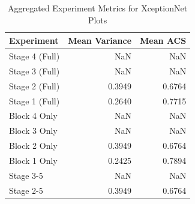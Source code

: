 \begin{table}
\caption{Aggregated Experiment Metrics for XceptionNet Plots}
\label{tab:exp_plot_data_xceptionnet}
\begin{tabular}{lrr}
\toprule
Experiment & Mean Variance & Mean ACS \\
\midrule
Stage 4 (Full) & NaN & NaN \\
Stage 3 (Full) & NaN & NaN \\
Stage 2 (Full) & 0.3949 & 0.6764 \\
Stage 1 (Full) & 0.2640 & 0.7715 \\
Block 4 Only & NaN & NaN \\
Block 3 Only & NaN & NaN \\
Block 2 Only & 0.3949 & 0.6764 \\
Block 1 Only & 0.2425 & 0.7894 \\
Stage 3-5 & NaN & NaN \\
Stage 2-5 & 0.3949 & 0.6764 \\
\bottomrule
\end{tabular}
\end{table}
